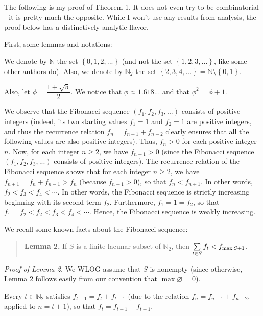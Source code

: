 \documentclass[numbers=enddot,12pt,final,onecolumn,notitlepage]{scrartcl}%
\numberwithin{exer}{section}
\theoremstyle{definition}
\let\sumnonlimits\sum
\renewcommand{\sum}{\sumnonlimits\limits}
\begin{document}
The following is my proof of Theorem 1. It does not even try to be
combinatorial - it is pretty much the opposite. While I won't use any results
from analysis, the proof below has a distinctively analytic flavor.

First, some lemmas and notations:

We denote by $\mathbb{N}$ the set $\left\{  0,1,2,...\right\}  $ (and not the
set $\left\{  1,2,3,...\right\}  $, like some other authors do). Also, we
denote by $\mathbb{N}_{2}$ the set $\left\{  2,3,4,...\right\}  =\mathbb{N}%
\setminus\left\{  0,1\right\}  $.

Also, let $\phi=\dfrac{1+\sqrt{5}}{2}$. We notice that $\phi\approx1.618...$
and that $\phi^{2}=\phi+1$.

We observe that the Fibonacci sequence $\left(  f_{1},f_{2},f_{3},...\right)
$ consists of positive integers (indeed, its two starting values $f_{1}=1$ and
$f_{2}=1$ are positive integers, and thus the recurrence relation
$f_{n}=f_{n-1}+f_{n-2}$ clearly ensures that all the following values are also
positive integers). Thus, $f_{n} > 0$ for each positive integer $n$. Now, for
each integer $n \geq2$, we have $f_{n-1} > 0$ (since the Fibonacci sequence
$\left(  f_{1},f_{2},f_{3},...\right)  $ consists of positive integers). The
recurrence relation of the Fibonacci sequence shows that for each integer $n
\geq2$, we have $f_{n+1} = f_{n} + f_{n-1} > f_{n}$ (because $f_{n-1} > 0$),
so that $f_{n} < f_{n+1}$. In other words, $f_{2} < f_{3} < f_{4} < \cdots$.
In other words, the Fibonacci sequence is strictly increasing beginning with
its second term $f_{2}$. Furthermore, $f_{1} = 1 = f_{2}$, so that $f_{1} =
f_{2} < f_{2} < f_{3} < f_{4} < \cdots$. Hence, the Fibonacci sequence is
weakly increasing.

We recall some known facts about the Fibonacci sequence:

\begin{quote}
\textbf{Lemma 2.} If $S$ is a finite lacunar subset of $\mathbb{N}_{2}$, then
$\sum\limits_{t\in S}f_{t}<f_{\max S+1}$.
\end{quote}

\textit{Proof of Lemma 2.} We WLOG assume that $S$ is nonempty (since
otherwise, Lemma 2 follows easily from our convention that $\max\varnothing=
0$).

Every $t\in\mathbb{N}_{2}$ satisfies $f_{t+1}=f_{t}+f_{t-1}$ (due to the
relation $f_{n}=f_{n-1}+f_{n-2}$, applied to $n=t+1$), so that $f_{t}%
=f_{t+1}-f_{t-1}$.
\end{document}

